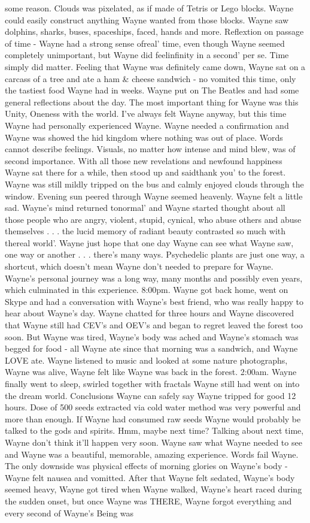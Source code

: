 \documentclass[12pt]{book}
\begin{document}
some reason. Clouds was pixelated, as if made of Tetris or Lego blocks. Wayne could easily construct anything Wayne wanted from those blocks. Wayne saw dolphins, sharks, buses, spaceships, faced, hands and more. Reflextion on passage of time - Wayne had a strong sense ofreal' time, even though Wayne seemed completely unimportant, but Wayne did feelinfinity in a second' per se. Time simply did matter. Feeling that Wayne was definitely came down, Wayne sat on a carcass of a tree and ate a ham \& cheese sandwich - no vomited this time, only the tastiest food Wayne had in weeks. Wayne put on The Beatles and had some general reflections about the day. The most important thing for Wayne was this Unity, Oneness with the world. I've always felt Wayne anyway, but this time Wayne had personally experienced Wayne. Wayne needed a confirmation and Wayne was showed the hid kingdom where nothing was out of place. Words cannot describe feelings. Visuals, no matter how intense and mind blew, was of second importance. With all those new revelations and newfound happiness Wayne sat there for a while, then stood up and saidthank you' to the forest. Wayne was still mildly tripped on the bus and calmly enjoyed clouds through the window. Evening sun peered through Wayne seemed heavenly. Wayne felt a little sad. Wayne's mind returned tonormal' and Wayne started thought about all those people who are angry, violent, stupid, cynical, who abuse others and abuse themselves . . .  the lucid memory of radiant beauty contrasted so much with thereal world'. Wayne just hope that one day Wayne can see what Wayne saw, one way or another . . .  there's many ways. Psychedelic plants are just one way, a shortcut, which doesn't mean Wayne don't needed to prepare for Wayne. Wayne's personal journey was a long way, many months and possibly even years, which culminated in this experience. 8:00pm. Wayne got back home, went on Skype and had a conversation with Wayne's best friend, who was really happy to hear about Wayne's day. Wayne chatted for three hours and Wayne discovered that Wayne still had CEV's and OEV's and began to regret leaved the forest too soon. But Wayne was tired, Wayne's body was ached and Wayne's stomach was begged for food - all Wayne ate since that morning was a sandwich, and Wayne LOVE ate. Wayne listened to music and looked at some nature photographs, Wayne was alive, Wayne felt like Wayne was back in the forest. 2:00am. Wayne finally went to sleep, swirled together with fractals Wayne still had went on into the dream world. Conclusions Wayne can safely say Wayne tripped for good 12 hours. Dose of 500 seeds extracted via cold water method was very powerful and more than enough. If Wayne had consumed raw seeds Wayne would probably be talked to the gods and spirits. Hmm, maybe next time? Talking about next time, Wayne don't think it'll happen very soon. Wayne saw what Wayne needed to see and Wayne was a beautiful, memorable, amazing experience. Words fail Wayne. The only downside was physical effects of morning glories on Wayne's body - Wayne felt nausea and vomitted. After that Wayne felt sedated, Wayne's body seemed heavy, Wayne got tired when Wayne walked, Wayne's heart raced during the sudden onset, but once Wayne was THERE, Wayne forgot everything and every second of Wayne's Being was 
\end{document}
